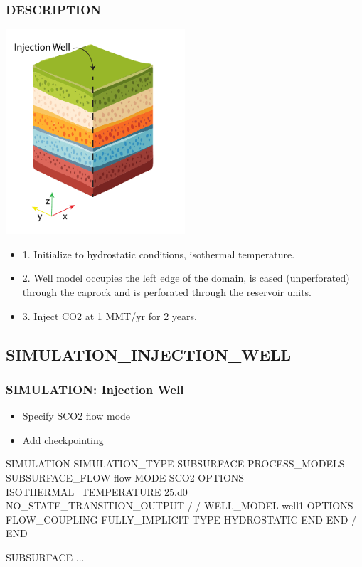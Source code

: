 \documentclass{beamer}
\begin{document}
\begin{frame}\frametitle{DESCRIPTION}

\includegraphics[height=3in]{injection-well-fig.pdf}

\newpage
\begin{itemize}
  \item 1. Initialize to hydrostatic conditions, isothermal temperature.
  \item 2. Well model occupies the left edge of the domain, is cased (unperforated) through the caprock and is perforated through the reservoir units.
  \item 3. Inject CO2 at 1 MMT/yr for 2 years.
\end{itemize}

\end{frame}

\subsection{SIMULATION\_INJECTION\_WELL}

\begin{frame}\frametitle{SIMULATION: Injection Well}

\begin{itemize}
\item Specify SCO2 flow mode
\item Add checkpointing
\end{itemize}


\begin{semiverbatim}
SIMULATION
  SIMULATION_TYPE SUBSURFACE
  PROCESS_MODELS
    SUBSURFACE_FLOW flow
      MODE SCO2
      OPTIONS
        ISOTHERMAL_TEMPERATURE 25.d0
        NO_STATE_TRANSITION_OUTPUT
      /
    /
\newpage
    WELL_MODEL well1
      OPTIONS
        FLOW_COUPLING FULLY_IMPLICIT
        TYPE HYDROSTATIC
      END
    END
  /
END

SUBSURFACE
...

\end{semiverbatim}

\end{frame}
\end{document}
